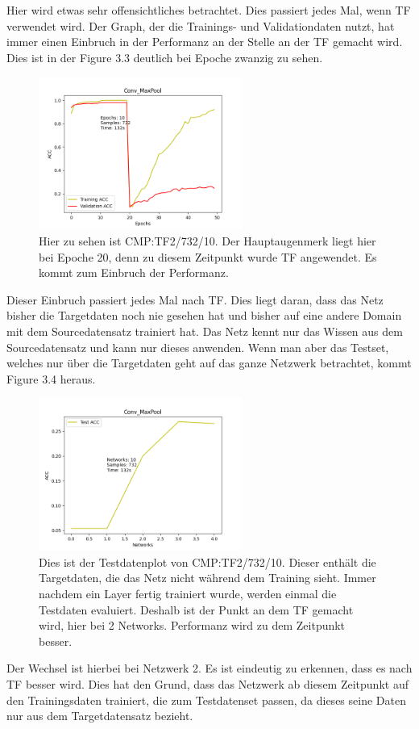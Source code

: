 Hier wird etwas sehr offensichtliches betrachtet. Dies passiert jedes Mal, wenn TF verwendet wird. 
Der Graph, der die Trainings- und Validationdaten nutzt, hat immer einen Einbruch in der Performanz an der Stelle an 
der TF gemacht wird. Dies ist in der Figure 3.3 deutlich bei Epoche zwanzig zu sehen.

\begin{figure}[htpb]
    \centering
    \includegraphics[height=5cm]{../../Plots/ba_plots/convmaxpool/convmaxpooltrain.png}
    \caption{\label{fig:convmaxpooltrain} 
    \small{Hier zu sehen ist CMP:TF2/732/10. Der Hauptaugenmerk liegt hier bei Epoche 20, denn zu diesem Zeitpunkt wurde TF angewendet. 
    Es kommt zum Einbruch der Performanz.}}
\end{figure}

Dieser Einbruch passiert jedes Mal nach TF. Dies liegt daran, dass das Netz bisher die Targetdaten noch nie gesehen hat und bisher 
auf eine andere Domain mit dem Sourcedatensatz trainiert hat. Das Netz kennt nur das Wissen aus dem Sourcedatensatz und kann nur dieses 
anwenden. Wenn man aber das Testset, welches nur über die Targetdaten geht auf das ganze Netzwerk betrachtet, kommt Figure 3.4 heraus. 

\begin{figure}[htpb]
    \centering
    \includegraphics[height=5cm]{../../Plots/ba_plots/convmaxpool/convmaxpooltest.png}
    \caption{\label{fig:convmaxpooltest} 
    \small{Dies ist der Testdatenplot von CMP:TF2/732/10. Dieser enthält die Targetdaten, die das Netz nicht 
    während dem Training sieht. Immer nachdem ein Layer fertig trainiert wurde, werden einmal die Testdaten evaluiert. Deshalb ist der Punkt 
    an dem TF gemacht wird, hier bei 2 Networks. Performanz wird zu dem Zeitpunkt besser.}}
\end{figure}

Der Wechsel ist hierbei bei Netzwerk 2. Es ist eindeutig zu erkennen, dass es nach TF besser wird. Dies hat den Grund, dass das Netzwerk 
ab diesem Zeitpunkt auf den Trainingsdaten trainiert, die zum Testdatenset passen, da dieses seine Daten nur aus dem Targetdatensatz bezieht. 
